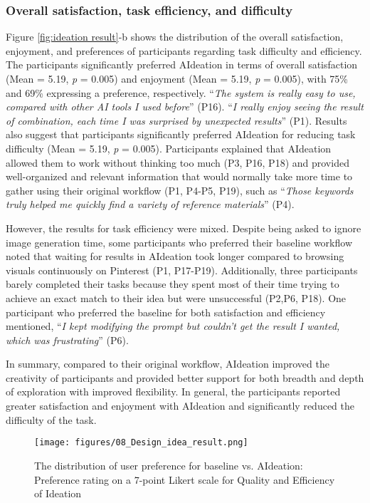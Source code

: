 \subsubsection{Overall satisfaction, task efficiency, and difficulty}
Figure \ref{fig:ideation result}-b shows the distribution of the overall satisfaction, enjoyment, and preferences of participants regarding task difficulty and efficiency. The participants significantly preferred AIdeation in terms of overall satisfaction (Mean = 5.19, \textit{p} = 0.005) and enjoyment (Mean = 5.19, \textit{p} = 0.005), with 75\% and 69\% expressing a preference, respectively. “\textit{The system is really easy to use, compared with other AI tools I used before}” (P16). “\textit{I really enjoy seeing the result of combination, each time I was surprised by unexpected results}” (P1). Results also suggest that participants significantly preferred AIdeation for reducing task difficulty (Mean = 5.19, \textit{p} = 0.005). Participants explained that AIdeation allowed them to work without thinking too much (P3, P16, P18) and provided well-organized and relevant information that would normally take more time to gather using their original workflow (P1, P4-P5, P19), such as “\textit{Those keywords truly helped me quickly find a variety of reference materials}” (P4).

However, the results for task efficiency were mixed. Despite being asked to ignore image generation time, some participants who preferred their baseline workflow noted that waiting for results in AIdeation took longer compared to browsing visuals continuously on Pinterest (P1, P17-P19). Additionally, three participants barely completed their tasks because they spent most of their time trying to achieve an exact match to their idea but were unsuccessful (P2,P6, P18). One participant who preferred the baseline for both satisfaction and efficiency mentioned, “\textit{I kept modifying the prompt but couldn’t get the result I wanted, which was frustrating}” (P6).

In summary, compared to their original workflow, AIdeation improved the creativity of participants and provided better support for both breadth and depth of exploration with improved flexibility. In general, the participants reported greater satisfaction and enjoyment with AIdeation and significantly reduced the difficulty of the task.

\begin{figure*}
    \centering
    \texttt{[image: figures/08\_Design\_idea\_result.png]}
    \caption{The distribution of user preference for baseline vs. AIdeation:  Preference rating on a 7-point Likert scale for Quality and Efficiency of Ideation}
    \label{fig:design idea result}
\end{figure*}

